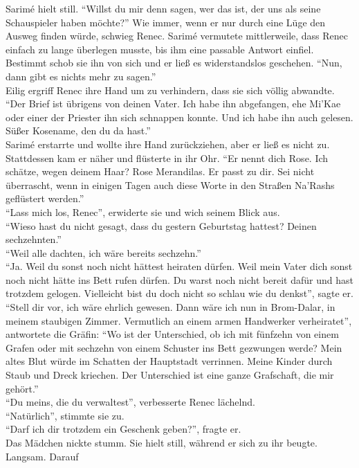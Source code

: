Sarimé hielt still. ``Willst du mir denn sagen, wer das ist, der uns als seine Schauspieler haben 
möchte?''
Wie immer, wenn er nur durch eine Lüge den Ausweg finden würde, schwieg Renec. Sarimé vermutete 
mittlerweile, dass Renec einfach zu lange überlegen musste, bis ihm eine passable Antwort einfiel. 
Bestimmt schob sie ihn von sich und er ließ es widerstandslos geschehen. ``Nun, dann gibt es nichts 
mehr zu sagen.''\\
Eilig ergriff Renec ihre Hand um zu verhindern, dass sie sich völlig abwandte. ``Der Brief ist 
übrigens von deinen Vater. Ich habe ihn abgefangen, ehe Mi'Kae oder einer der Priester ihn sich 
schnappen konnte. Und ich habe ihn auch gelesen. Süßer Kosename, den du da hast.''\\
Sarimé erstarrte und wollte ihre Hand zurückziehen, aber er ließ es nicht zu. Stattdessen kam er 
näher und flüsterte in ihr Ohr. ``Er nennt dich Rose. Ich schätze, wegen deinem Haar? Rose 
Merandilas. Er passt zu dir. Sei nicht überrascht, wenn in einigen Tagen auch diese Worte in den 
Straßen Na'Rashs geflüstert werden.''\\
``Lass mich los, Renec'', erwiderte sie und wich seinem Blick aus.\\
``Wieso hast du nicht gesagt, dass du gestern Geburtstag hattest? Deinen sechzehnten.''\\
``Weil alle dachten, ich wäre bereits sechzehn.''\\
``Ja. Weil du sonst noch nicht hättest heiraten dürfen. Weil mein Vater dich sonst noch nicht hätte 
ins Bett rufen dürfen. Du warst noch nicht bereit dafür und hast trotzdem gelogen. Vielleicht bist 
du doch nicht so schlau wie du denkst'', sagte er.\\
``Stell dir vor, ich wäre ehrlich gewesen. Dann wäre ich nun in Brom-Dalar, in meinem staubigen 
Zimmer. Vermutlich an einem armen Handwerker verheiratet'', antwortete die Gräfin: ``Wo ist der 
Unterschied, ob ich mit fünfzehn von einem Grafen oder mit sechzehn von einem Schuster ins Bett 
gezwungen werde? Mein altes Blut würde im Schatten der Hauptstadt verrinnen. Meine Kinder durch 
Staub und Dreck kriechen. Der Unterschied ist eine ganze Grafschaft, die mir gehört.''\\
``Du meins, die du verwaltest'', verbesserte Renec lächelnd.\\
``Natürlich'', stimmte sie zu.\\
``Darf ich dir trotzdem ein Geschenk geben?'', fragte er.\\
Das Mädchen nickte stumm. Sie hielt still, während er sich zu ihr beugte. Langsam. Darauf 
